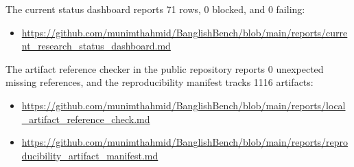 The current status dashboard reports 71 rows, 0 blocked, and 0 failing:

\begin{itemize}
\item \url{https://github.com/munimthahmid/BanglishBench/blob/main/reports/current_research_status_dashboard.md}
\end{itemize}

The artifact reference checker in the public repository reports 0 unexpected missing references, and the reproducibility manifest tracks 1116 artifacts:

\begin{itemize}
\item \url{https://github.com/munimthahmid/BanglishBench/blob/main/reports/local_artifact_reference_check.md}
\item \url{https://github.com/munimthahmid/BanglishBench/blob/main/reports/reproducibility_artifact_manifest.md}
\end{itemize}

\endinput
